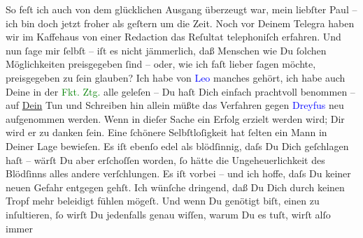            \noindent{}{\pb}So feſt ich auch von dem glücklichen Ausgang
               überzeugt war, mein liebſter Paul – ich bin doch jetzt froher als geſtern um die
               Zeit. Noch vor Deinem Telegra{\geminationm} haben wir im Kaffehaus
               von einer Redaction {\pb}das Reſultat telephoniſch
               erfahren. Und nun ſage mir ſelbſt – iſt es nicht jämmerlich, daß Menschen wie Du
               ſolchen Möglichkeiten preisgegeben ſind – oder, wie ich faſt lieber ſagen möchte,
               preisgegeben zu ſein glauben? Ich habe von \textcolor{blue}{Leo}{}\ledrightnote{\textcolor{blue}{Leo Van-Jung}}
               manches gehört, ich habe auch Deine \label{K_L02686-1v}\label{K_L02686-1h} in der \textcolor{green}{Fkt. Ztg.}{}\ledrightnote{\textcolor{green}{Frankfurter Zeitung}} alle geleſen – Du haſt
               Dich einfach prachtvoll benommen – auf \uline{Dein} Tun und
               Schreiben hin allein müßte das Verfahren gegen \textcolor{blue}{Dreyfus}{}\ledrightnote{\textcolor{blue}{Alfred Dreyfus}} neu aufgenommen werden.\pend
           \pstart
           Wenn in dieſer Sache ein Erfolg erzielt werden wird; Dir wird er zu danken ſein. Eine
               ſchönere Selbſtloſig{\pb}keit hat ſelten ein Mann in
               Deiner Lage bewieſen. Es iſt ebenſo edel als blödſinnig, daſs Du Dich geſchlagen haſt
               – wärſt Du aber erſchoſſen worden, ſo hätte die Ungeheuerlichkeit des Blödſinns alles
               andere verſchlungen. Es iſt vorbei – und ich hoffe, daſs Du keiner neuen Gefahr
               entgegen {\pb}gehſt. Ich wünſche dringend, daß Du Dich
               durch keinen Tropf mehr beleidigt fühlen mögeſt. Und wenn Du genötigt biſt, einen zu
               inſultieren, ſo wirſt Du jedenfalls genau wiſſen, warum Du es tuſt, wirſt alſo immer
